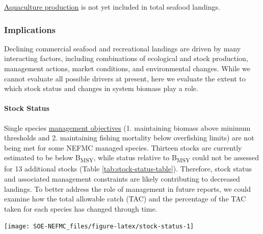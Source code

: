\documentclass[
  10pt,
]{article}
\let\origfigure\figure
\let\endorigfigure\endfigure
\renewenvironment{figure}[1][2] {
    \expandafter\origfigure\expandafter[H]
} {
    \endorigfigure
}
\begin{document}
\href{https://noaa-edab.github.io/catalog/aquaculture.html}{Aquaculture production} is not yet included in total seafood landings.

\hypertarget{implications}{%
\subsubsection{Implications}\label{implications}}

Declining commercial seafood and recreational landings are driven by many interacting factors, including combinations of ecological and stock production, management actions, market conditions, and environmental changes. While we cannot evaluate all possible drivers at present, here we evaluate the extent to which stock status and changes in system biomass play a role.

\hypertarget{stock-status}{%
\paragraph{Stock Status}\label{stock-status}}

Single species \href{https://noaa-edab.github.io/catalog/stock_status.html}{management objectives} (1. maintaining biomass above minimum thresholds and 2. maintaining fishing mortality below overfishing limits) are not being met for some NEFMC managed species. Thirteen stocks are currently estimated to be below B\textsubscript{MSY}, while status relative to B\textsubscript{MSY} could not be assessed for 13 additional stocks (Table \ref{tab:stock-status-table}). Therefore, stock status and associated management constraints are likely contributing to decreased landings. To better address the role of management in future reports, we could examine how the total allowable catch (TAC) and the percentage of the TAC taken for each species has changed through time.

\begin{figure}

{\centering \texttt{[image: SOE-NEFMC\_files/figure-latex/stock-status-1]} 

}

\caption{Summary of single species status for NEFMC and jointly federally managed stocks (goosefish and spiny dogfish).  The dotted vertical line at one is the target biomass reference point of B.  The dashed lines are the management thresholds of B (vertical) or F (horizontal). Colors denote stocks with B/B\textsubscript{MSY} < 0.5 or F/F\textsubscript{MSY} (orange), stocks 0.5<B/B\textsubscript{MSY}<1 (blue), and stocks B/B\textsubscript{MSY}>1 (green).CCGOM = Cape Cod Gulf of Maine, GOM = Gulf of Maine, GB = Georges Bank, SNEMA = Southern New England Mid Atlantic}\label{fig:stock-status}
\end{figure}
\end{document}
